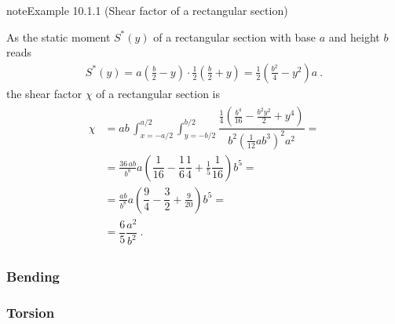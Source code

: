 \documentclass[letterpaper,10pt,english]{jupyterBook}
\begin{document}
\begin{sphinxadmonition}{note}{Example 10.1.1 (Shear factor of a rectangular section)}



\sphinxAtStartPar
As the static moment \(S^*(y)\) of a rectangular section with base \(a\) and height \(b\) reads
\begin{equation*}
\begin{split}S^*(y) = a \left( \frac{b}{2} - y \right) \cdot \frac{1}{2} \left( \frac{b}{2} + y \right) = \frac{1}{2} \left( \frac{b^2}{4} - y^2 \right) a \ .\end{split}
\end{equation*}
\sphinxAtStartPar
the shear factor \(\chi\) of a rectangular section is
\begin{equation*}
\begin{split}\begin{aligned}
  \chi 
  & = ab \, \int_{x = -a/2}^{a/2} \int_{y = -b/2}^{b/2} \dfrac{ \frac{1}{4} \left( \frac{b^4}{16} - \frac{b^2 y^2}{2} + y^4 \right)}{ b^2 \left(\frac{1}{12} a b^3\right)^2 a^2 } = \\
  & = \frac{36 \, ab}{b^8} a \left( \dfrac{1}{16} - \dfrac{1}{6}\dfrac{1}{4} + \frac{1}{5} \dfrac{1}{16} \right) b^5 = \\
  & = \frac{ab}{b^8} a \left( \dfrac{9}{4} - \dfrac{3}{2} + \frac{9}{20} \right) b^5 = \\
  & = \dfrac{6}{5} \dfrac{a^2}{b^2} \ .
\end{aligned}\end{split}
\end{equation*}\end{sphinxadmonition}


\subsubsection{Bending}
\label{\detokenize{ch/solids/beams/de-saint-venant:bending}}\label{\detokenize{ch/solids/beams/de-saint-venant:solid-mechanics-small-displacements-beams-de-saint-venant-internal-actions-bending}}

\subsubsection{Torsion}
\label{\detokenize{ch/solids/beams/de-saint-venant:torsion}}\label{\detokenize{ch/solids/beams/de-saint-venant:solid-mechanics-small-displacements-beams-de-saint-venant-internal-actions-torsion}}
\sphinxstepscope
\end{document}

